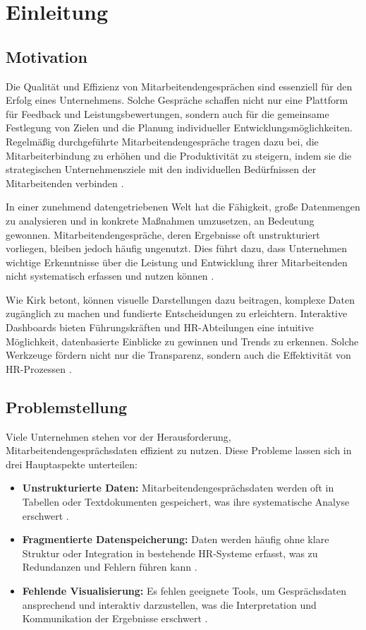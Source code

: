 \chapter{Einleitung}
\label{chap:einleitung}

\section{Motivation}
Die Qualität und Effizienz von Mitarbeitendengesprächen sind essenziell für den Erfolg eines Unternehmens. Solche Gespräche schaffen nicht nur eine Plattform für Feedback und Leistungsbewertungen, sondern auch für die gemeinsame Festlegung von Zielen und die Planung individueller Entwicklungsmöglichkeiten. Regelmäßig durchgeführte Mitarbeitendengespräche tragen dazu bei, die Mitarbeiterbindung zu erhöhen und die Produktivität zu steigern, indem sie die strategischen Unternehmensziele mit den individuellen Bedürfnissen der Mitarbeitenden verbinden \cite{schober2008, bryson2011employee}.

In einer zunehmend datengetriebenen Welt hat die Fähigkeit, große Datenmengen zu analysieren und in konkrete Maßnahmen umzusetzen, an Bedeutung gewonnen. Mitarbeitendengespräche, deren Ergebnisse oft unstrukturiert vorliegen, bleiben jedoch häufig ungenutzt. Dies führt dazu, dass Unternehmen wichtige Erkenntnisse über die Leistung und Entwicklung ihrer Mitarbeitenden nicht systematisch erfassen und nutzen können \cite{kirk2016data}. 

Wie Kirk \cite{kirk2016data} betont, können visuelle Darstellungen dazu beitragen, komplexe Daten zugänglich zu machen und fundierte Entscheidungen zu erleichtern. Interaktive Dashboards bieten Führungskräften und HR-Abteilungen eine intuitive Möglichkeit, datenbasierte Einblicke zu gewinnen und Trends zu erkennen. Solche Werkzeuge fördern nicht nur die Transparenz, sondern auch die Effektivität von HR-Prozessen \cite{evergreen2016effective}.

\section{Problemstellung}
Viele Unternehmen stehen vor der Herausforderung, Mitarbeitendengesprächsdaten effizient zu nutzen. Diese Probleme lassen sich in drei Hauptaspekte unterteilen:
\begin{itemize}
    \item \textbf{Unstrukturierte Daten:} Mitarbeitendengesprächsdaten werden oft in Tabellen oder Textdokumenten gespeichert, was ihre systematische Analyse erschwert \cite{duarte2012performance}.
    \item \textbf{Fragmentierte Datenspeicherung:} Daten werden häufig ohne klare Struktur oder Integration in bestehende HR-Systeme erfasst, was zu Redundanzen und Fehlern führen kann \cite{bryson2011employee}.
    \item \textbf{Fehlende Visualisierung:} Es fehlen geeignete Tools, um Gesprächsdaten ansprechend und interaktiv darzustellen, was die Interpretation und Kommunikation der Ergebnisse erschwert \cite{ware2012information}.
\end{itemize}

